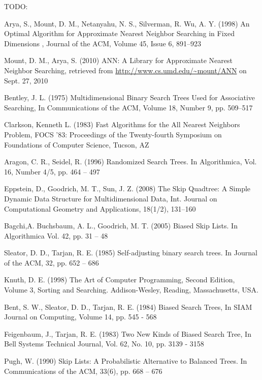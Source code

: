 \documentclass[mcs]{scsthesis}
\begin{document}
TODO:

\begin{thebibliography}{5}

    Arya, S., Mount, D. M., Netanyahu, N. S., Silverman, R. Wu, A. Y. (1998) An Optimal Algorithm for Approximate Nearest Neighbor Searching in Fixed Dimensions , Journal of the ACM, Volume 45, Issue 6, 891--923

    Mount, D. M., Arya, S. (2010) ANN: A Library for Approximate Nearest Neighbor Searching, retrieved from \url{http://www.cs.umd.edu/~mount/ANN} on Sept. 27, 2010

    Bentley, J. L. (1975) Multidimensional Binary Search Trees Used for Associative Searching,
In Communications of the ACM, Volume 18, Number 9, pp. 509--517 

    Clarkson, Kenneth L. (1983) Fast Algorithms for the All Nearest Neighbors Problem,
FOCS '83: Proceedings of the Twenty-fourth Symposium on Foundations of Computer Science,
Tucson, AZ 
 
Aragon, C. R.,  Seidel, R. (1996) Randomized Search Trees.
In Algorithmica, Vol. 16, Number 4/5, pp. 464 – 497

    Eppstein, D., Goodrich, M. T., Sun, J. Z. (2008) The Skip Quadtree: A Simple Dynamic Data Structure for Multidimensional Data, Int. Journal on Computational Geometry and Applications, 18(1/2), 131--160 

Bagchi,A. Buchsbaum, A. L., Goodrich, M. T. (2005) Biased Skip Lists.
In Algorithmica Vol. 42, pp. 31 – 48
 
Sleator, D. D., Tarjan, R. E. (1985) Self-adjusting binary search trees.
In Journal of the ACM, 32, pp. 652 – 686

Knuth, D. E. (1998) The Art of Computer Programming, Second Edition,
Volume 3, Sorting and Searching.  Addison-Wesley, Reading, Massachusetts, USA.

Bent, S. W., Sleator, D. D., Tarjan, R. E. (1984) Biased Search Trees,
In SIAM Journal on Computing, Volume 14, pp. 545 - 568

Feigenbaum, J., Tarjan, R. E. (1983) Two New Kinds of Biased Search Tree,
In Bell Systems Technical Journal, Vol. 62, No. 10, pp. 3139 - 3158

Pugh, W. (1990) Skip Lists: A Probabilistic Alternative to Balanced Trees.
In Communications of the ACM, 33(6), pp. 668 – 676


\end{thebibliography}
\end{document}
